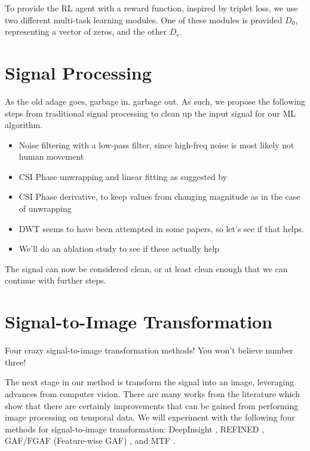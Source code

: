 To provide the RL agent with a reward function, inspired by triplet loss, we use two different multi-task learning modules.
One of these modules is provided $D_{0}$, representing a vector of zeros, and the other $D_{r}$.


\section{Signal Processing}\label{sec:methodology-signal-preprocessing}

As the old adage goes, garbage in, garbage out.
As such, we propose the following steps from traditional signal processing to clean up the input signal for our ML algorithm.

\begin{itemize}
	\item Noise filtering with a low-pass filter, since high-freq noise is most likely not human movement
	\item CSI Phase unwrapping and linear fitting as suggested by \cite{geng2022densepose}
	\item CSI Phase derivative, to keep values from changing magnitude as in the case of unwrapping
	\item DWT seems to have been attempted in some papers, so let's see if that helps.
	\item We'll do an ablation study to see if these actually help
\end{itemize}

The signal can now be considered clean, or at least clean enough that we can continue with further steps.

\section{Signal-to-Image Transformation}\label{sec:methodology-signal-to-image}

Four crazy signal-to-image transformation methods! You won't believe number three!

The next stage in our method is transform the signal into an image, leveraging advances from computer vision.
There are many works from the literature which show that there are certainly improvements that can be gained from performing image processing on temporal data.
We will experiment with the following four methods for signal-to-image transformation: DeepInsight \cite{sharma2019deepinsight}, REFINED \cite{bazgir2020representation}, GAF/FGAF (Feature-wise GAF) \cite{wang2015imaging,satyawan2023cnns}, and MTF \cite{wang2015imaging}.

